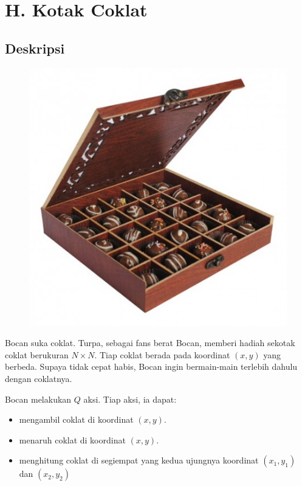 \documentclass{article}
\begin{document}
\section*{\hfil H. Kotak Coklat\hfil}


\subsection*{Deskripsi}

\begin{figure}[h!]
	\centering
	\includegraphics[width=0.5\linewidth]{box-of-chocolate}
\end{figure}

\par\noindent Bocan suka coklat. Turpa, sebagai fans berat Bocan, memberi hadiah sekotak coklat berukuran $N \times N$. Tiap coklat berada pada koordinat $(x,y)$ yang berbeda. Supaya tidak cepat habis, Bocan ingin bermain-main terlebih dahulu dengan coklatnya.

\par\noindent Bocan melakukan $Q$ aksi. Tiap aksi, ia dapat:

\begin{itemize}
	\item mengambil coklat di koordinat $(x,y)$.
	\item menaruh coklat di koordinat $(x,y)$.
	\item menghitung coklat di segiempat yang kedua ujungnya koordinat $(x_1,y_1)$ dan $(x_2,y_2)$
\end{itemize}
\end{document}

